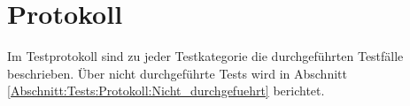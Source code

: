 %



\newpage



\section{Protokoll}
\label{Abschnitt:Tests:Protokoll}

Im Testprotokoll sind zu jeder Testkategorie die durchgeführten Testfälle beschrieben. Über nicht durchgeführte Tests wird in Abschnitt \ref*{Abschnitt:Tests:Protokoll:Nicht_durchgefuehrt} berichtet.








